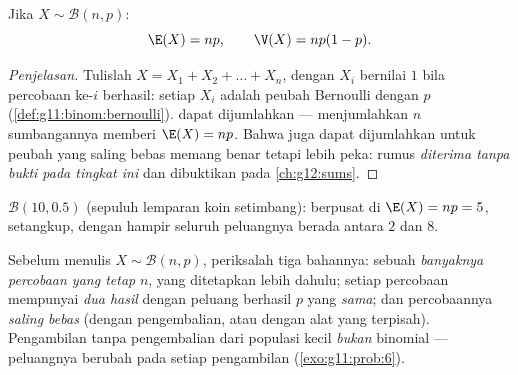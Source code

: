 \begin{proposition}\label{prop:g11:binom:expectation}
Jika $X \sim \mathcal B(n, p)$:
\[
\E(X) = np,
\qquad
\V(X) = np(1-p).
\]
\end{proposition}

\begin{proof}[Penjelasan]
Tulislah $X = X_1 + X_2 + \dots + X_n$, dengan $X_i$ bernilai $1$ bila
percobaan ke-$i$ berhasil: setiap $X_i$ adalah peubah Bernoulli dengan  $p$ (\cref{def:g11:binom:bernoulli}).  dapat dijumlahkan ---
menjumlahkan $n$ sumbangannya memberi $\E(X) = np$. Bahwa \emph{} juga
dapat dijumlahkan untuk peubah yang saling bebas memang benar tetapi lebih
peka: rumus  \emph{diterima tanpa bukti pada tingkat ini} dan
dibuktikan pada \cref{ch:g12:sums}.
\end{proof}

\begin{omfigure}

{\small {} $\mathcal B(10, 0.5)$ (sepuluh lemparan koin setimbang):
berpusat di $\E(X) = np = 5$, setangkup, dengan hampir seluruh peluangnya
berada antara $2$ dan $8$.}
\end{omfigure}

\begin{method}\label{met:g11:binom:recognize}
Sebelum menulis $X \sim \mathcal B(n, p)$, periksalah tiga bahannya: sebuah
\emph{banyaknya percobaan yang tetap} $n$, yang ditetapkan lebih dahulu; setiap
percobaan mempunyai \emph{dua hasil} dengan peluang berhasil $p$ yang
\emph{sama}; dan percobaannya \emph{saling bebas} (dengan pengembalian, atau
dengan alat yang terpisah). Pengambilan tanpa pengembalian dari populasi kecil
\emph{bukan} binomial --- peluangnya berubah pada setiap pengambilan
(\cref{exo:g11:prob:6}).
\end{method}

